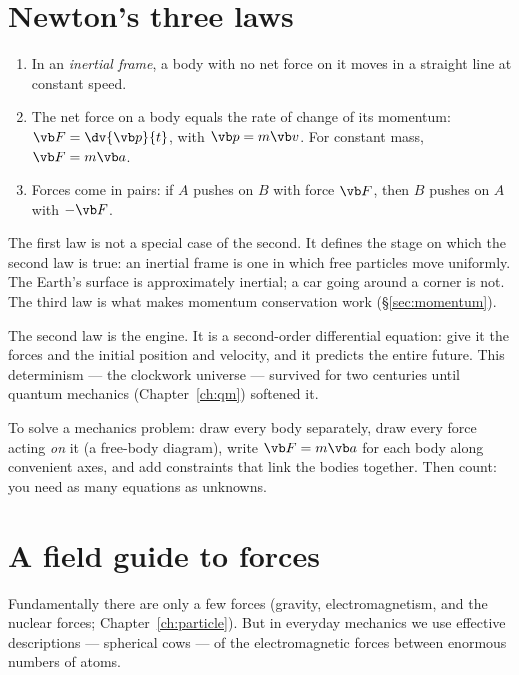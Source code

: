 \section{Newton's three laws}

\begin{law}
\begin{enumerate}[label=(\arabic*),itemsep=2pt]
  \item In an \emph{inertial frame}, a body with no net force on it moves in a straight line at constant speed.
  \item The net force on a body equals the rate of change of its momentum: $\vb F = \dv{\vb p}{t}$, with $\vb p = m\vb v$. For constant mass, $\vb F = m\vb a$.
  \item Forces come in pairs: if $A$ pushes on $B$ with force $\vb F$, then $B$ pushes on $A$ with $-\vb F$.
\end{enumerate}
\end{law}

The first law is not a special case of the second. It defines the stage on which the second law is true: an inertial frame is one in which free particles move uniformly. The Earth's surface is approximately inertial; a car going around a corner is not. The third law is what makes momentum conservation work (\S\ref{sec:momentum}).

The second law is the engine. It is a second-order differential equation: give it the forces and the initial position and velocity, and it predicts the entire future. This determinism --- the clockwork universe --- survived for two centuries until quantum mechanics (Chapter~\ref{ch:qm}) softened it.

\begin{keyidea}
To solve a mechanics problem: draw every body separately, draw every force acting \emph{on} it (a free-body diagram), write $\vb F = m\vb a$ for each body along convenient axes, and add constraints that link the bodies together. Then count: you need as many equations as unknowns.
\end{keyidea}

\section{A field guide to forces}

Fundamentally there are only a few forces (gravity, electromagnetism, and the nuclear forces; Chapter~\ref{ch:particle}). But in everyday mechanics we use effective descriptions --- spherical cows --- of the electromagnetic forces between enormous numbers of atoms.

